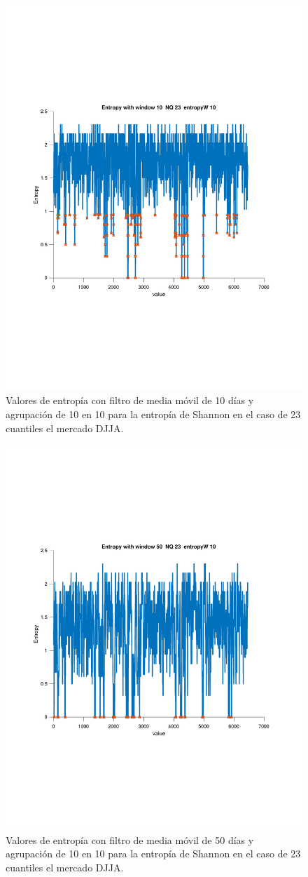 \begin{figure}[h]
	\centering
	\includegraphics[width=0.7\linewidth]{figures_matlab/Entropy_window_10_NQ_23_entropyW_10}
	\caption{Valores de entropía con filtro de media móvil de 10 días y agrupación de 10 en 10 para la entropía de Shannon en el caso de 23 cuantiles el mercado DJJA.}
	\label{mav10Entropy10nq23}
\end{figure}

\begin{figure}[h]
	\centering
	\includegraphics[width=0.7\linewidth]{figures_matlab/Entropy_window_50_NQ_23_entropyW_10}
	\caption{Valores de entropía con filtro de media móvil de 50 días y agrupación de 10 en 10 para la entropía de Shannon en el caso de 23 cuantiles el mercado DJJA.}
	\label{mav50Entropy10nq23}
\end{figure}


